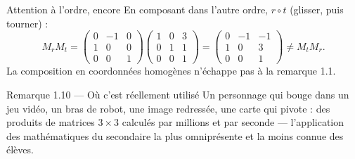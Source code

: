 \begin{frame}{Attention à l'ordre, encore}
  \small En composant dans l'autre ordre, $r\circ t$ (glisser, puis
  tourner) :
  \[
    M_rM_t = \begin{pmatrix} 0&-1&0\\ 1&0&0\\ 0&0&1\end{pmatrix}
    \begin{pmatrix} 1&0&3\\ 0&1&1\\ 0&0&1\end{pmatrix}
    = \begin{pmatrix} 0&-1&-1\\ 1&0&3\\ 0&0&1\end{pmatrix}
    \neq M_tM_r.
  \]
  La composition en coordonnées homogènes n'échappe pas à la remarque
  1.1.

  \begin{Rem}{Remarque 1.10 --- Où c'est réellement utilisé}
    \small Un personnage qui bouge dans un jeu vidéo, un bras de robot,
    une image redressée, une carte qui pivote : des produits de
    matrices $3\times 3$ calculés par millions et par seconde ---
    l'application des mathématiques du secondaire la plus omniprésente
    et la moins connue des élèves.
  \end{Rem}
\end{frame}
